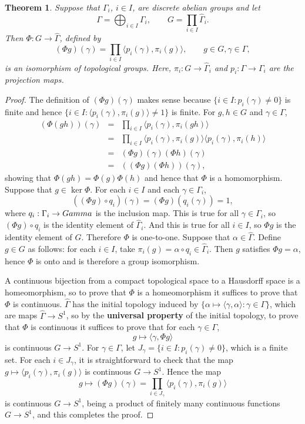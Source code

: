 \documentclass{article}
\newcommand{\inner}[2]{\langle #1, #2 \rangle}
\newtheorem{theorem}{Theorem}
\begin{document}
\begin{theorem}
Suppose that $\Gamma_i$, $i \in I$, are discrete abelian groups
and let
\[
 \Gamma = \bigoplus_{i \in I} \Gamma_i, \qquad G= \prod_{i \in I} \widehat{\Gamma}_i.
\]
Then $\Phi:G \to \widehat{\Gamma}$, defined by
\[
(\Phi g)(\gamma) = \prod_{i \in I} \inner{p_i(\gamma)}{\pi_i(g)}, \qquad g \in G, \gamma \in \Gamma,
\]
is an isomorphism of topological groups. Here, $\pi_i:G \to \widehat{\Gamma}_i$   and $p_i:\Gamma  \to \Gamma_i$  
are the projection maps.
\end{theorem}
\begin{proof}
The definition of $(\Phi g)(\gamma)$ makes sense because $\{i \in I: p_i(\gamma) \neq 0\}$ is finite and hence
$\{i \in I:  \inner{p_i(\gamma)}{\pi_i(g)} \neq 1\}$ is finite. For $g,h \in G$ and $\gamma \in \Gamma$,
\begin{eqnarray*}
(\Phi (gh))(\gamma)& =& \prod_{i \in I}\inner{p_i(\gamma)}{\pi_i(gh)}\\
& =& \prod_{i \in I}\inner{p_i(\gamma)}{\pi_i(g)}\inner{p_i(\gamma)}{\pi_i(h)}\\
& =& (\Phi g)(\gamma) (\Phi h)(\gamma)\\
& =& ((\Phi g)(\Phi h))(\gamma),
\end{eqnarray*}
showing that $\Phi(gh)=\Phi(g)\Phi(h)$ and 
hence that $\Phi$ is a homomorphism. Suppose that $g \in \ker \Phi$. 
For each $i \in I$ and each $\gamma \in \Gamma_i$,
\[
((\Phi g) \circ q_i )(\gamma) = (\Phi g)(q_i(\gamma))=1,
\]
where $q_i:\Gamma_i \to \\Gamma$ is the inclusion map.
 This is true for all $\gamma \in \Gamma_i$, so $(\Phi g) \circ q_i$ is the identity element of $\widehat{\Gamma}_i$. And this is true for all
$i \in I$, so $\Phi g$ is the identity element of $G$. Therefore $\Phi$ is one-to-one. Suppose that
$\alpha \in \widehat{\Gamma}$.  Define $g \in G$ as follows: for each $i \in I$, take $\pi_i(g) = \alpha \circ q_i \in \widehat{\Gamma}_i$. Then $g$
satisfies  
$\Phi g = \alpha$, hence $\Phi$ is onto and is therefore a group isomorphism.

A continuous bijection from a compact topological space to a Hausdorff space is a homeomorphism, so to prove
that $\Phi$ is a homeomorphism it suffices to prove that $\Phi$ is continuous. $\widehat{\Gamma}$ has the initial topology induced by
$\{\alpha \mapsto  \inner{\gamma}{\alpha}: \gamma \in \Gamma\}$, which are  maps $\widehat{\Gamma} \to S^1$, so by the \textbf{universal property} of the initial topology, to prove that
$\Phi$ is continuous it suffices to prove  that for each $\gamma \in \Gamma$,
\[
g \mapsto \inner{\gamma}{\Phi g}
\]
 is continuous
$G \to S^1$. For $\gamma \in \Gamma$, let $J_\gamma=\{i \in I: p_i(\gamma) \neq 0\}$, which is a finite set. 
For each $i \in J_\gamma$,  it is straightforward to check that the map $g \mapsto \inner{p_i( \gamma)}{\pi_i(g)}$  is continuous $G \to S^1$.
Hence the map
\[
g \mapsto (\Phi g)(\gamma) = \prod_{i \in J_\gamma} \inner{p_i(\gamma)}{\pi_i(g)} 
\]
is continuous $G \to S^1$, being a product of finitely many continuous functions $G \to S^1$, and this completes the proof.
\end{proof}
\end{document}
